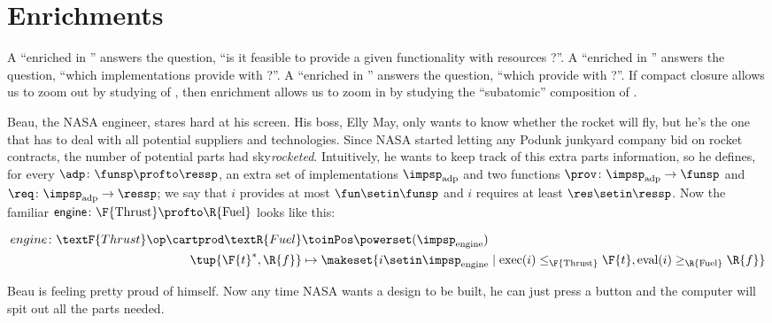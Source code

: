 
\section{Enrichments}
\label{sec:enriched}


A  ``enriched in \Bool'' answers the question, ``is it feasible to provide a given functionality \fun with resources \res?''.
A  ``enriched in \Set'' answers the question, ``which implementations provide \fun with \res?''.
A  ``enriched in \DP'' answers the question, ``which  provide \fun with \res?''.
If compact closure allows us to zoom out by studying  of , then enrichment allows us to zoom in by studying the ``subatomic'' composition of .

\begin{example}
    \label{ex:dpi_example}
    Beau, the NASA engineer, stares hard at his screen.
    His boss, Elly May, only wants to know whether the rocket will fly, but he's the one that has to deal with all potential suppliers and technologies.
    Since NASA started letting any Podunk junkyard company bid on rocket contracts, the number of potential parts had sky\emph{rocketed}.
    Intuitively, he wants to keep track of this extra parts information, so he defines, for every  $\adp \colon \funsp \profto \ressp$, an extra set of implementations $\impsp_\text{adp}$ and two functions $\prov\colon \impsp_\text{adp} \to \funsp$ and  $\req\colon \impsp_\text{adp} \to \ressp$; we say that $i$ provides at most $\fun \setin \funsp$ and $i$ requires at least $\res \setin \ressp$.
    Now the familiar $\mathsf{engine} \colon \F{\text{Thrust}} \profto \R{\text{Fuel}}$  looks like this:
    \begin{widepar}
        \begin{equation}
            \begin{aligned}
                engine \colon \textF{Thrust}\op \cartprod \textR{Fuel} & \toinPos \powerset(\impsp_\text{engine}) \\
                \tup{\F{t}^*,\R{f}}                                    & \mapsto \makeset{ i \setin \impsp_\text{engine} \mid \text{exec}(i) \leq_\F{\text{Thrust}} \F{t}, \text{eval}(i) \geq_\R{\text{Fuel}} \R{f} }
            \end{aligned}
        \end{equation}
    \end{widepar}
    Beau is feeling pretty proud of himself.
    Now any time NASA wants a design to be built, he can just press a button and the computer will spit out all the parts needed.
\end{example}

